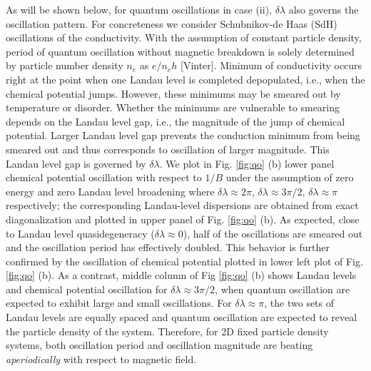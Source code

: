 \documentclass[aps, prb, showpacs, twocolumn, notitlepage, superscriptaddress]{revtex4-1}
\begin{document}


As will be shown below, for quantum oscillations in case (ii), $\delta\lambda$ also governs the oscillation pattern. For concreteness we consider Schubnikov-de Haas (SdH) oscillations of the conductivity. With the assumption of constant particle density, period of quantum oscillation without magnetic breakdown is solely determined by particle number density $n_e$ as $e/n_eh$ [Vinter]. Minimum of conductivity occurs right at the point when one Landau level is completed depopulated, i.e., when the chemical potential jumps. However, these minimums may be smeared out by temperature or disorder. Whether the minimums are vulnerable to smearing depends on the Landau level gap, i.e., the magnitude of the jump of chemical potential. Larger Landau level gap prevents the conduction minimum from being smeared out and thus corresponds to oscillation of larger magnitude. This Landau level gap is governed by $\delta\lambda$. We plot in Fig. \ref{fig:qo} (b) lower panel chemical potential oscillation with respect to $1/B$ under the assumption of zero energy and zero Landau level broadening where $\delta\lambda{\approx}2\pi$, $\delta\lambda{\approx}3\pi/2$, $\delta\lambda{\approx}\pi$ respectively; the corresponding Landau-level dispersions are obtained from exact diagonalization and plotted in upper panel of Fig. \ref{fig:qo} (b). As expected, close to Landau level quasidegeneracy ($\delta\lambda\approx 0$), half of the oscillations are smeared out and the oscillation period has effectively doubled. This behavior is further confirmed by the oscillation of chemical potential plotted in lower left plot of Fig. \ref{fig:qo} (b). As a contrast, middle column of Fig \ref{fig:qo} (b) shows Landau levels and chemical potential oscillation for $\delta\lambda\approx 3\pi/2$, when quantum oscillation are expected to exhibit large and small oscillations. For $\delta\lambda\approx\pi$, the two sets of Landau levels are equally spaced and quantum oscillation are expected to reveal the particle density of the system. Therefore, for 2D fixed particle density systems, both oscillation period and oscillation magnitude are beating \textit{aperiodically} with respect to magnetic field.
\end{document}
